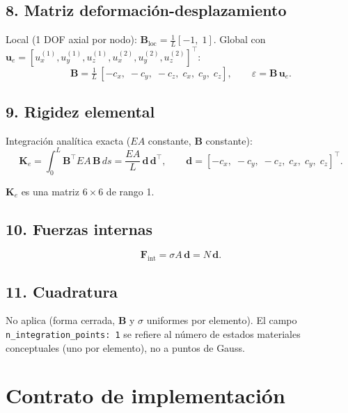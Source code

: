 \documentclass[11pt,letterpaper,oneside]{report}
\begin{document}
\subsection{8. Matriz deformación-desplazamiento}
Local (1 DOF axial por nodo): $\mathbf B_{\text{loc}} = \tfrac{1}{L}[-1,\; 1]$.
Global con $\mathbf u_e = [u_x^{(1)}, u_y^{(1)}, u_z^{(1)}, u_x^{(2)}, u_y^{(2)}, u_z^{(2)}]^\top$:
\[
\mathbf B = \tfrac{1}{L}\,[-c_x,\; -c_y,\; -c_z,\; c_x,\; c_y,\; c_z], \qquad \varepsilon = \mathbf B\,\mathbf u_e.
\]

\subsection{9. Rigidez elemental}
Integración analítica exacta ($EA$ constante, $\mathbf B$ constante):
\[
\mathbf K_e = \int_0^L \mathbf B^\top EA\,\mathbf B\,ds = \frac{EA}{L}\,\mathbf d\,\mathbf d^\top, \qquad \mathbf d = [-c_x,\; -c_y,\; -c_z,\; c_x,\; c_y,\; c_z]^\top.
\]

$\mathbf K_e$ es una matriz $6\times 6$ de rango 1.

\subsection{10. Fuerzas internas}
\[
\mathbf F_{\text{int}} = \sigma A\,\mathbf d = N\,\mathbf d.
\]

\subsection{11. Cuadratura}
No aplica (forma cerrada, $\mathbf B$ y $\sigma$ uniformes por elemento). El campo \texttt{n\_integration\_points: 1} se refiere al número de estados materiales conceptuales (uno por elemento), no a puntos de Gauss.


\section{Contrato de implementación}
\end{document}
